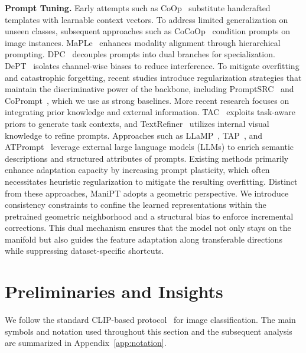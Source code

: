 \documentclass{article}
\theoremstyle{plain}
\theoremstyle{definition}
\theoremstyle{remark}
\begin{document}
	\textbf{Prompt Tuning.} Early attempts such as CoOp~\citep{zhou2022coop} substitute handcrafted templates with learnable context vectors. To address limited generalization on unseen classes, subsequent approaches such as CoCoOp~\citep{zhou2022cocoop} condition prompts on image instances. MaPLe~\citep{khattak2023maple} enhances modality alignment through hierarchical prompting. DPC~\citep{wang2023dpc} decouples prompts into dual branches for specialization. DePT~\citep{xu2023dept} isolates channel-wise biases to reduce interference. To mitigate overfitting and catastrophic forgetting, recent studies introduce regularization strategies that maintain the discriminative power of the backbone, including PromptSRC~\citep{yao2023promptsrc} and CoPrompt~\citep{zhang2023coprompt}, which we use as strong baselines. More recent research focuses on integrating prior knowledge and external information. TAC~\citep{liu2023tac} exploits task-aware priors to generate task contexts, and TextRefiner~\citep{chen2023textrefiner} utilizes internal visual knowledge to refine prompts. Approaches such as LLaMP~\citep{zhang2023llamp}, TAP~\citep{wang2023tap}, and ATPrompt~\citep{li2023atprompt} leverage external large language models (LLMs) to enrich semantic descriptions and structured attributes of prompts. Existing methods primarily enhance adaptation capacity by increasing prompt plasticity, which often necessitates heuristic regularization to mitigate the resulting overfitting. Distinct from these approaches, ManiPT adopts a geometric perspective. We introduce consistency constraints to confine the learned representations within the pretrained geometric neighborhood and a structural bias to enforce incremental corrections. This dual mechanism ensures that the model not only stays on the manifold but also guides the feature adaptation along transferable directions while suppressing dataset-specific shortcuts.
	\vspace{-10pt}
	\section{Preliminaries and Insights}
	\label{sec:preliminaries}
	We follow the standard CLIP-based protocol~\citep{radford2021learning,zhou2022coop} for image classification. The main symbols and notation used throughout this section and the subsequent analysis are summarized in Appendix~\ref{app:notation}.
	
\end{document}
